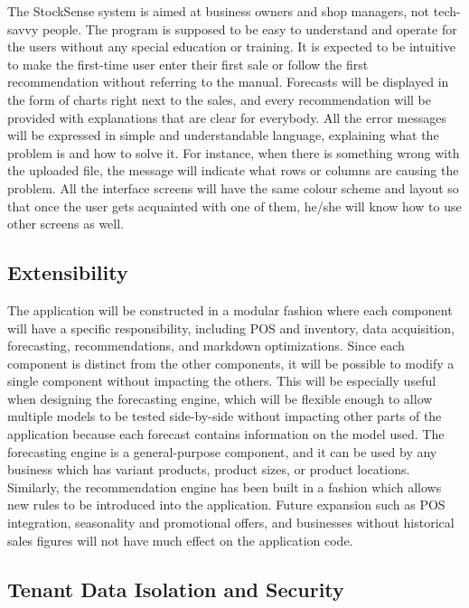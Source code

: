 \documentclass{StockSense}
\begin{document}
The StockSense system is aimed at business owners and shop managers, not tech-savvy people. The program is supposed to be easy to understand and operate for the users without any special education or training. It is expected to be intuitive to make the first-time user enter their first sale or follow the first recommendation without referring to the manual. Forecasts will be displayed in the form of charts right next to the sales, and every recommendation will be provided with explanations that are clear for everybody. All the error messages will be expressed in simple and understandable language, explaining what the problem is and how to solve it. For instance, when there is something wrong with the uploaded file, the message will indicate what rows or columns are causing the problem. All the interface screens will have the same colour scheme and layout so that once the user gets acquainted with one of them, he/she will know how to use other screens as well.

\subsection{Extensibility}

The application will be constructed in a modular fashion where each component will have a specific responsibility, including POS and inventory, data acquisition, forecasting, recommendations, and markdown optimizations. Since each component is distinct from the other components, it will be possible to modify a single component without impacting the others. This will be especially useful when designing the forecasting engine, which will be flexible enough to allow multiple models to be tested side-by-side without impacting other parts of the application because each forecast contains information on the model used. The forecasting engine is a general-purpose component, and it can be used by any business which has variant products, product sizes, or product locations. Similarly, the recommendation engine has been built in a fashion which allows new rules to be introduced into the application. Future expansion such as POS integration, seasonality and promotional offers, and businesses without historical sales figures will not have much effect on the application code.

\subsection{Tenant Data Isolation and Security}
\end{document}
